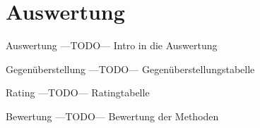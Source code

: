 \section{Auswertung}
\begin{frame}{Auswertung}
---TODO--- Intro in die Auswertung
\end{frame}
\begin{frame}{Gegen\"uberstellung}
---TODO--- Gegenüberstellungstabelle
\end{frame}
\begin{frame}{Rating}
---TODO--- Ratingtabelle
\end{frame}
\begin{frame}{Bewertung}
---TODO--- Bewertung der Methoden
\end{frame}
